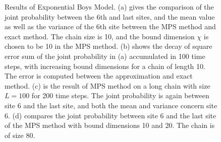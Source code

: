 \documentclass[english]{article}[12pt]
\begin{document}
\begin{figure}[H]
  \caption{Results of Exponential Boys Model. (a) gives the comparison of the joint probability between the 6th and last sites, and the mean value as well as the variance of the 6th site between the MPS method and exact method. The chain size is 10, and the bound dimension $\chi$ is chosen to be 10 in the MPS method. (b) shows the decay of square error sum of the joint probability in (a) accumulated in 100 time steps, with increasing bound dimensions for a chain of length 10. The error is computed between the approximation and exact method. (c) is the result of MPS method on a long chain with size $L=100$ for 200 time steps. The joint probability is again between site 6 and the last site, and both the mean and variance concern site 6. (d) compares the joint probability between site 6 and the last site of the MPS method with bound dimensions 10 and 20. The chain is of size 80.}
  \label{fig:Exponential_result}
\end{figure}
\end{document}
